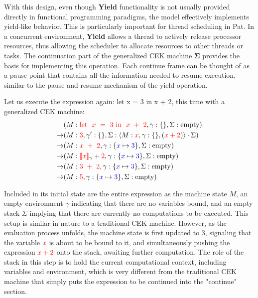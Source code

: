 \documentclass{l4proj}
\begin{document}
\vspace{10pt}
With this design, even though \textbf{Yield} functionality is not usually provided directly in functional programming paradigms, the model effectively implements yield-like behavior. This is particularly important for thread scheduling in Pat. In a concurrent environment, \textbf{Yield} allows a thread to actively release processor resources, thus allowing the scheduler to allocate resources to other threads or tasks. The continuation part of the generalized CEK machine $\boldsymbol{\Sigma}$ provides the basis for implementing this operation. Each continue frame can be thought of as a pause point that contains all the information needed to resume execution, similar to the pause and resume mechanism of the yield operation.

Let us execute the expression again: let x = 3 in x + 2, this time with a generalized CEK machine:
\begin{align*}
& (M: \textcolor{red}{\text{let } \ x\ =\ 3\ \text{in } \ x\ +\ 2}, \gamma: \{\}, \Sigma: \text{empty}) \\
\rightarrow & (M: \textcolor{red}{3}, \gamma': \{\}, \Sigma: \langle M: \textcolor{red}{x}, \gamma: \{\}, (\textcolor{red}{x+2})\rangle \cdot \Sigma) \\
\rightarrow & (M: \textcolor{red}{x\ +\ 2}, \gamma: \{ \textcolor{blue}{x} \mapsto \textcolor{blue}{3}\}, \Sigma: \text{empty}) \\
\rightarrow & (M: \textcolor{red}{\text{\textlbrackdbl} x \text{\textrbrackdbl}}_{\gamma} + \textcolor{red}{2}, \gamma: \{ \textcolor{blue}{x} \mapsto \textcolor{blue}{3}\}, \Sigma: \text{empty}) \\
\rightarrow & (M: \textcolor{red}{3\ +\ 2}, \gamma: \{ \textcolor{blue}{x} \mapsto \textcolor{blue}{3}\}, \Sigma: \text{empty}) \\
\rightarrow & (M: \textcolor{red}{5}, \gamma: \{ \textcolor{blue}{x} \mapsto \textcolor{blue}{3}\}, \Sigma: \text{empty})
\end{align*}

Included in its initial state are the entire expression as the machine state \(M\), an empty environment \(\gamma\) indicating that there are no variables bound, and an empty stack \(\Sigma\) implying that there are currently no computations to be executed. This setup is similar in nature to a traditional CEK machine. However, as the evaluation process unfolds, the machine state is first updated to {\color{red}3}, signaling that the variable $\color{red}x$ is about to be bound to it, and simultaneously pushing the expression $\color{red}x + 2$ onto the stack, awaiting further computation. The role of the stack in this step is to hold the current computational context, including variables and environment, which is very different from the traditional CEK machine that simply puts the expression to be continued into the "continue" section.
\end{document}
